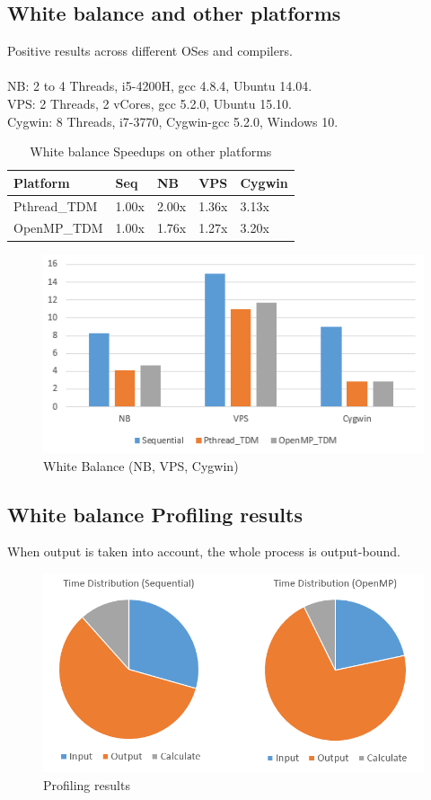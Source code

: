 \documentclass{acm_proc_article-sp}
\begin{document}
\subsection{White balance and other platforms}
Positive results across different OSes and compilers. \\ \\
NB: 2 to 4 Threads, i5-4200H, gcc 4.8.4, Ubuntu 14.04. \\
VPS: 2 Threads, 2 vCores, gcc 5.2.0, Ubuntu 15.10. \\
Cygwin: 8 Threads, i7-3770, Cygwin-gcc 5.2.0, Windows 10.
\begin{table}[H]
\centering
\caption{White balance Speedups on other platforms}
\begin{tabular}{|l|l|l|l|l|} \hline
Platform&Seq&NB&VPS&Cygwin\\ \hline
Pthread\_TDM & 1.00x & 2.00x & 1.36x & 3.13x \\ \hline
OpenMP\_TDM & 1.00x & 1.76x & 1.27x & 3.20x \\ \hline
\end{tabular}
\end{table}
\begin{figure}[H]
  \includegraphics[width=\linewidth,natwidth=473,natheight=247]{white_platforms.png}
  \caption{White Balance (NB, VPS, Cygwin)}
  \label{fig:white_platforms}
\end{figure}

\subsection{White balance Profiling results}
When output is taken into account, the whole process is output-bound.
\begin{figure}[H]
  \includegraphics[width=\linewidth,natwidth=757,natheight=395]{profile.png}
  \caption{Profiling results}
  \label{fig:profile}
\end{figure}
\end{document}
